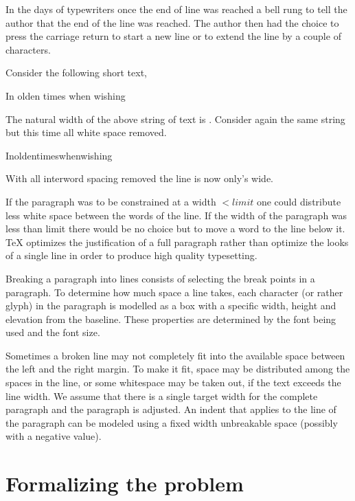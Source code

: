 {{In the days of typewriters once the end of line was reached a bell rung to tell the author that the end of the line was reached. The author then had the choice to press the carriage return to start a new line or to extend the line by a couple of characters.

Consider the following short text, 

\begin{scriptexample}{}{}
In olden times when wishing
\end{scriptexample}

 \newlength\myl
 \settowidth{}
The natural width of the above string of text is \the\myl. Consider again the same string but this time all white space removed.

\begin{scriptexample}{}{}
Inoldentimeswhenwishing
\end{scriptexample}
\settowidth{}
With all interword spacing removed the line is now only\the\myl's wide.  

If the paragraph was to be constrained at a width $<limit$ one could distribute less white space between the words of the line. If the width of the paragraph was less than limit there would be no choice but to move a word to the line below it. TeX optimizes the justification of a full paragraph rather than optimize the looks of a single line in order to produce high quality typesetting.


Breaking a paragraph into lines consists of selecting the break points in a paragraph. To determine how much space a line takes, each character (or rather glyph) in the paragraph is modelled as a box with a specific width, height and elevation from the baseline. These properties are determined by the font being used and the font size.


Sometimes a broken line may not completely fit into the available space between the left and the right margin. To make it fit, space may be distributed among the spaces in the line, or some whitespace may be taken out, if the text exceeds the 
line width. We assume that there is a single target width for the complete paragraph and the paragraph is adjusted. 
An indent that applies to the line of the paragraph can be modeled using a fixed width unbreakable space (possibly with a negative value).

\section{Formalizing the problem}

}}
